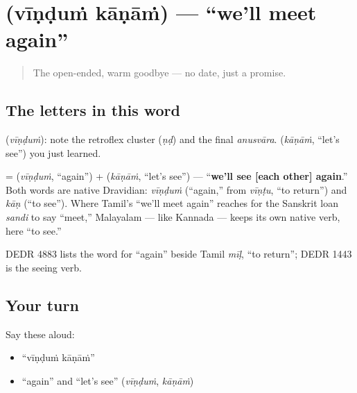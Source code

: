 \section[\texorpdfstring{\ml{വീണ്ടും} \ml{കാണാം} (vīṇḍuṁ kāṇāṁ)}{വീണ്ടും കാണാം (vīṇḍuṁ kāṇāṁ)}]{  (vīṇḍuṁ kāṇāṁ) — \textquotedblleft{}we'll meet again\textquotedblright{}}

\label{lesson:ML-C04-veendum-kaanaam}



\begin{quote}
The open-ended, warm goodbye — no date, just a promise.
\end{quote}

\subsection*{The letters in this word}
\textbf{} (\emph{vīṇḍuṁ}): note the retroflex cluster \textbf{} (\emph{ṇḍ}) and the final \emph{anusvāra}. \textbf{} (\emph{kāṇāṁ}, \textquotedblleft{}let's see\textquotedblright{}) you just learned.

\begin{cousinweb}
\textbf{ } = \textbf{} (\emph{vīṇḍuṁ}, \textquotedblleft{}again\textquotedblright{}) + \textbf{} (\emph{kāṇāṁ}, \textquotedblleft{}let's see\textquotedblright{}) — \textquotedblleft{}\textbf{we'll see {[}each other{]} again}.\textquotedblright{} Both words are native Dravidian: \emph{vīṇḍuṁ} (\textquotedblleft{}again,\textquotedblright{} from \emph{vīṇṭu}, \textquotedblleft{}to return\textquotedblright{}) and \emph{kāṇ} (\textquotedblleft{}to see\textquotedblright{}). Where Tamil's \textquotedblleft{}we'll meet again\textquotedblright{} reaches for the Sanskrit loan \emph{sandi} to say \textquotedblleft{}meet,\textquotedblright{} Malayalam — like Kannada — keeps its own native verb, here \textquotedblleft{}to see.\textquotedblright{}

DEDR 4883 lists the word for \textquotedblleft{}again\textquotedblright{} beside Tamil \emph{mīḷ}, \textquotedblleft{}to return\textquotedblright{}; DEDR 1443 is the seeing verb.
\end{cousinweb}

\subsection*{Your turn}
Say these aloud:

\begin{itemize}
\raggedright
  \item \textquotedblleft{}vīṇḍuṁ kāṇāṁ\textquotedblright{}
  \item \textquotedblleft{}again\textquotedblright{} and \textquotedblleft{}let's see\textquotedblright{} (\emph{vīṇḍuṁ}, \emph{kāṇāṁ})
\end{itemize}

